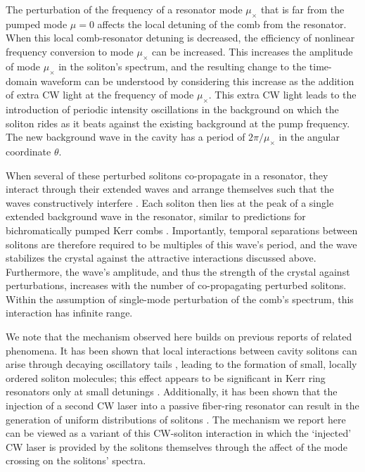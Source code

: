 The perturbation of the frequency of a resonator mode $\mu_\times$ that is far from the pumped mode $\mu=0$ affects the local detuning of the comb from the resonator. When this local comb-resonator detuning is decreased, the efficiency of nonlinear frequency conversion to mode $\mu_\times$ can be increased. This increases the amplitude of mode $\mu_\times$ in the soliton's spectrum, and the resulting change to the time-domain waveform can be understood by considering this increase as the addition of extra CW light at the frequency of mode $\mu_\times$. This extra CW light leads to the introduction of periodic intensity oscillations in the background on which the soliton rides as it beats against the existing background at the pump frequency. The new background wave in the cavity has a period of $2\pi/\mu_\times$ in the angular coordinate $\theta$. 

When several of these perturbed solitons co-propagate in a resonator, they interact through their extended waves and arrange themselves such that the waves constructively interfere \cite{Wang2017}. Each soliton then lies at the peak of a single extended background wave in the resonator, similar to predictions for bichromatically pumped Kerr combs \cite{Hansson2014}. Importantly, temporal separations between solitons are therefore required to be multiples of this wave's period, and the wave stabilizes the crystal against the attractive interactions discussed above. Furthermore, the wave's amplitude, and thus the strength of the crystal against perturbations, increases with the number of co-propagating perturbed solitons. Within the assumption of single-mode perturbation of the comb's spectrum, this interaction has infinite range. 

We note that the mechanism observed here builds on previous reports of related phenomena. It has been shown that local interactions between cavity solitons can arise through decaying oscillatory tails \cite{Skryabin1999}, leading to the formation of small, locally ordered soliton molecules; this effect appears to be significant in Kerr ring resonators only at small detunings \cite{Parra-Rivas2017}. Additionally, it has been shown that the injection of a second CW laser into a passive fiber-ring resonator can result in the generation of uniform distributions of solitons \cite{Wabnitz1996}. The mechanism we report here can be viewed as a variant of this CW-soliton interaction in which the `injected' CW laser is provided by the solitons themselves through the affect of the mode crossing on the solitons' spectra.


